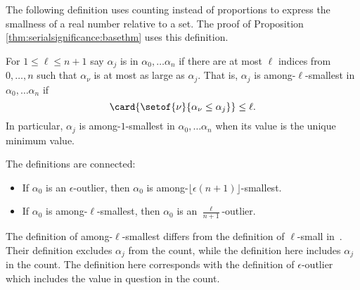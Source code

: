 \documentclass[12pt]{article}
\begin{document}
The following definition uses counting instead of proportions to express
the smallness of a real number relative to a set.  The proof of
Proposition~%
\ref{thm:serialsignificance:basethm} uses this definition.

\begin{definition}
    For \( 1 \le \ell \le n+1 \) say \( \alpha_j \) is %
    in \( \alpha_0, \dots \alpha_n \) if there are at most \( \ell \)
    indices from \( 0, \dots, n \) such that \( \alpha_{\nu} \) is at
    most as large as \( \alpha_j \).  That is, \( \alpha_j \) is among-\(
    \ell \)-smallest in \( \alpha_0, \dots \alpha_n \) if
    \[
        \card{ \setof{\nu}{\alpha_{\nu} \le \alpha_j}} \le \ell.
    \] In particular, \( \alpha_j \) is among-\( 1 \)-smallest in \(
    \alpha_0, \dots \alpha_n \) when its value is the unique minimum
    value.
\end{definition}

\begin{remark}
    The definitions are connected:
    \begin{itemize}
        \item
            If \( \alpha_0 \) is an \( \epsilon \)-outlier, then \(
            \alpha_0 \) is among-\( \lfloor \epsilon (n+1) \rfloor \)-smallest.
        \item
            If \( \alpha_0 \) is among-\( \ell \)-smallest, then \(
            \alpha_0 \) is an \( \frac{\ell}{n+1} \)-outlier.
    \end{itemize}
\end{remark}

\begin{remark}
  The definition of among-\( \ell \)-smallest differs from the
  definition of \(\ell\)-small in~\cite{Chikina2860}.  Their
  definition excludes \( \alpha_j \) from the count, while the
  definition here includes \( \alpha_j \) in the count.  The
  definition here corresponds with the definition of \( \epsilon
  \)-outlier which includes the value in question in the count.
\end{remark}
\end{document}
